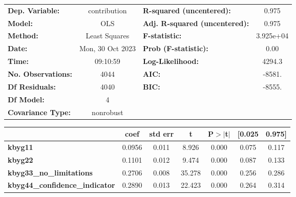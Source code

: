 \begin{center}
\begin{tabular}{lclc}
\toprule
\textbf{Dep. Variable:}                &   contribution   & \textbf{  R-squared (uncentered):}      &     0.975   \\
\textbf{Model:}                        &       OLS        & \textbf{  Adj. R-squared (uncentered):} &     0.975   \\
\textbf{Method:}                       &  Least Squares   & \textbf{  F-statistic:       }          & 3.925e+04   \\
\textbf{Date:}                         & Mon, 30 Oct 2023 & \textbf{  Prob (F-statistic):}          &     0.00    \\
\textbf{Time:}                         &     09:10:59     & \textbf{  Log-Likelihood:    }          &    4294.3   \\
\textbf{No. Observations:}             &        4044      & \textbf{  AIC:               }          &    -8581.   \\
\textbf{Df Residuals:}                 &        4040      & \textbf{  BIC:               }          &    -8555.   \\
\textbf{Df Model:}                     &           4      & \textbf{                     }          &             \\
\textbf{Covariance Type:}              &    nonrobust     & \textbf{                     }          &             \\
\bottomrule
\end{tabular}
\begin{tabular}{lcccccc}
                                       & \textbf{coef} & \textbf{std err} & \textbf{t} & \textbf{P$> |$t$|$} & \textbf{[0.025} & \textbf{0.975]}  \\
\midrule
\textbf{kbyg11}                        &       0.0956  &        0.011     &     8.926  &         0.000        &        0.075    &        0.117     \\
\textbf{kbyg22}                        &       0.1101  &        0.012     &     9.474  &         0.000        &        0.087    &        0.133     \\
\textbf{kbyg33\_no\_limitations}       &       0.2706  &        0.008     &    35.278  &         0.000        &        0.256    &        0.286     \\
\textbf{kbyg44\_confidence\_indicator} &       0.2890  &        0.013     &    22.423  &         0.000        &        0.264    &        0.314     \\

\end{tabular}
\end{center}
